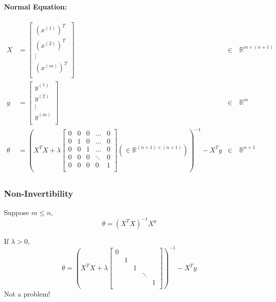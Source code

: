 \documentclass[a4paper, 12pt]{report}
\def\R{\mathbb{R}}
\begin{document}
\paragraph{Normal Equation:}
\begin{align*}
	X                   & = \begin{bmatrix}
		\left(x^{(1)}\right)^T \\
		\left(x^{(2)}\right)^T \\
		\vdots                 \\
		\left(x^{(m)}\right)^T \\
	\end{bmatrix} & \in        & \ \R^{m\times(n+1)} \\
	y                   & = \begin{bmatrix}
		y^{(1)} \\
		y^{(2)} \\
		\vdots  \\
		y^{(m)} \\
	\end{bmatrix} & \in        & \ \R^m              \\
	\theta              & = \left(
	X^TX + \lambda \begin{bmatrix}
		0 & 0 & 0 & \dots  & 0 \\
		0 & 1 & 0 & \dots  & 0 \\
		0 & 0 & 1 & \dots  & 0 \\
		0 & 0 & 0 & \ddots & 0 \\
		0 & 0 & 0 & 0      & 1 \\
	\end{bmatrix} \left(\in \R^{(n+1)\times(n+1)}\right)
	\right)^{-1} - X^Ty & \in                          & \ \R^{n+1}                       \\
\end{align*}

\subsubsection*{Non-Invertibility}
Suppose $m \le n$,
$$\theta = \left(X^TX\right)^{-1}X^y$$

If $\lambda > 0$,
$$
	\theta = \left(
	X^TX + \lambda \begin{bmatrix}
		0 &   &   &        &   \\
		  & 1 &   &        &   \\
		  &   & 1 &        &   \\
		  &   &   & \ddots &   \\
		  &   &   &        & 1 \\
	\end{bmatrix}
	\right)^{-1} - X^Ty
$$
Not a problem!
\end{document}
